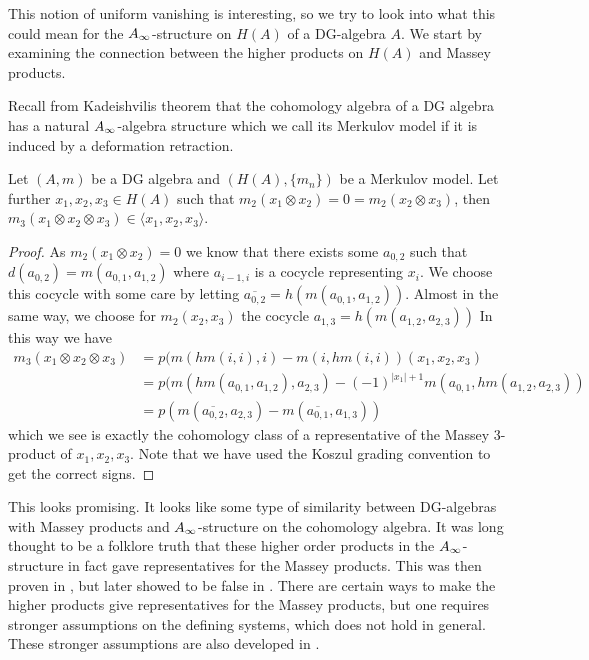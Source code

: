 This notion of uniform vanishing is interesting, so we try to look into what this could mean for the $A_{\infty}$-structure on $H(A)$ of a DG-algebra $A$. We start by examining the connection between the higher products on $H(A)$ and Massey products. 

Recall from Kadeishvilis theorem that the cohomology algebra of a DG algebra has a natural $A_{\infty}$-algebra structure which we call its Merkulov model if it is induced by a deformation retraction.

\begin{lemma}
Let $(A, m)$ be a DG algebra and $(H(A), \{m_n\})$ be a Merkulov model. Let further $x_1, x_2, x_3 \in H(A)$ such that $m_2(x_1\otimes x_2) = 0 = m_2(x_2\otimes x_3)$, then $m_3(x_1 \otimes x_2 \otimes x_3) \in \langle x_1, x_2, x_3 \rangle$.  
\end{lemma}
\begin{proof}
As $m_2(x_1 \otimes x_2) = 0$ we know that there exists some $a_{0,2}$ such that $d(a_{0,2}) = m(a_{0,1}, a_{1,2})$ where $a_{i-1, i}$ is a cocycle representing $x_i$. We choose this cocycle with some care by letting $\overline{a_{0,2}} = h(m(a_{0,1}, a_{1,2}))$. Almost in the same way, we choose for $m_2(x_2, x_3)$ the cocycle $a_{1,3} = h(m(a_{1,2}, a_{2,3}))$ In this way we have
\begin{align*}
    m_3(x_1\otimes x_2\otimes x_3) 
    &= p(m(hm(i, i), i)-m(i, hm(i,i))(x_1, x_2, x_3) \\
    &= p(m(hm(a_{0,1}, a_{1,2}), a_{2,3}) - (-1)^{|x_1|+1} m(a_{0,1}, hm(a_{1,2}, a_{2,3})) \\
    &= p(m(\overline{a_{0,2}}, a_{2,3})-m(\overline{a_{0,1}}, a_{1,3}))
\end{align*}
which we see is exactly the cohomology class of a representative of the Massey 3-product of $x_1, x_2, x_3$. Note that we have used the Koszul grading convention to get the correct signs. 
\end{proof}

This looks promising. It looks like some type of similarity between DG-algebras with Massey products and $A_{\infty}$-structure on the cohomology algebra. It was long thought to be a folklore truth that these higher order products in the $A_{\infty}$-structure in fact gave representatives for the Massey products. This was then proven in \cite{Ext}, but later showed to be false in \cite{detection}. There are certain ways to make the higher products give representatives for the Massey products, but one requires stronger assumptions on the defining systems, which does not hold in general. These stronger assumptions are also developed in \cite{detection}. 

